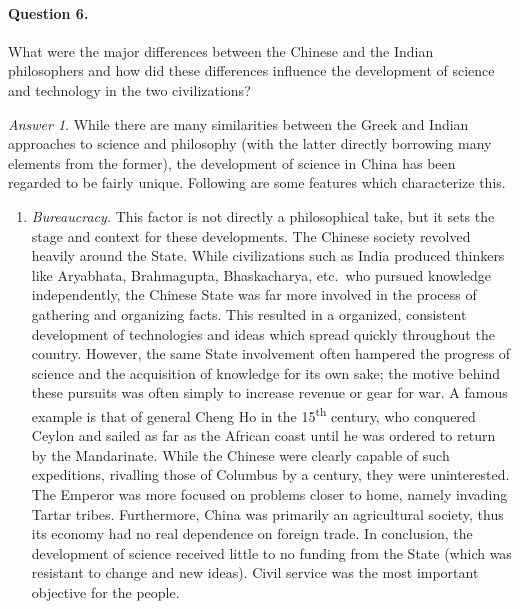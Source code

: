 \documentclass[11pt]{article}
\theoremstyle{remark}
\newtheorem*{answer}{Answer}
\begin{document}
    \paragraph{Question 6.} What were the major differences between the Chinese and
    the Indian philosophers and how did these differences influence the development
    of science and technology in the two civilizations?
    \begin{answer}
        While there are many similarities between the Greek and Indian approaches to
        science and philosophy (with the latter directly borrowing many elements from
        the former), the development of science in China has been regarded to be
        fairly unique. Following are some features which characterize this.
        \begin{enumerate}
            \item \emph{Bureaucracy.} This factor is not directly a philosophical
            take, but it sets the stage and context for these developments. The
            Chinese society revolved heavily around the State. While civilizations
            such as India produced thinkers like Aryabhata, Brahmagupta,
            Bhaskacharya, etc.\ who pursued knowledge independently, the Chinese
            State was far more involved in the process of gathering and organizing
            facts. This resulted in a organized, consistent development of
            technologies and ideas which spread quickly throughout the country.
            However, the same State involvement often hampered the progress of
            science and the acquisition of knowledge for its own sake; the motive
            behind these pursuits was often simply to increase revenue or gear for
            war. A famous example is that of general Cheng Ho in the
            15\textsuperscript{th} century, who conquered Ceylon and sailed as far as
            the African coast until he was ordered to return by the Mandarinate.
            While the Chinese were clearly capable of such expeditions, rivalling
            those of Columbus by a century, they were uninterested. The Emperor was
            more focused on problems closer to home, namely invading Tartar tribes.
            Furthermore, China was primarily an agricultural society, thus its
            economy had no real dependence on foreign trade. In conclusion, the
            development of science received little to no funding from the State (which
            was resistant to change and new ideas). Civil service was the most
            important objective for the people.


\end{enumerate}
\end{answer}
\end{document}
